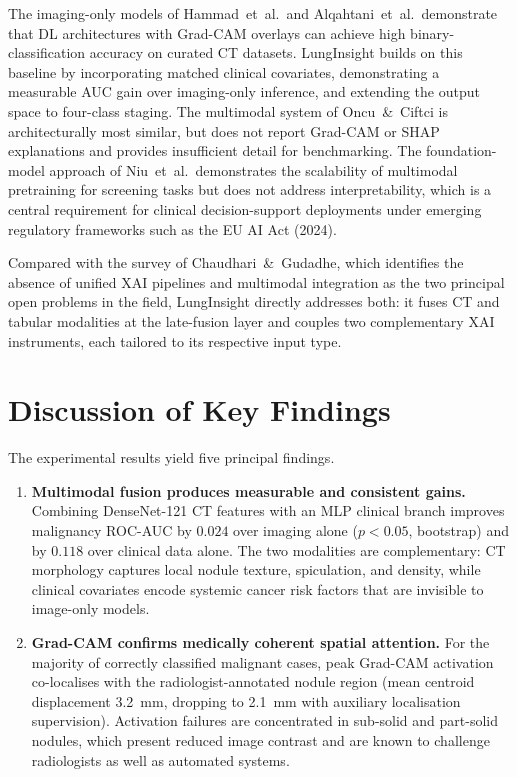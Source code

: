 {The imaging-only models of Hammad~et~al.\ and Alqahtani~et~al.\ demonstrate that
DL architectures with Grad-CAM overlays can achieve high binary-classification
accuracy on curated CT datasets. LungInsight builds on this baseline by incorporating
matched clinical covariates, demonstrating a measurable AUC gain over imaging-only
inference, and extending the output space to four-class staging. The multimodal
system of Oncu~\&~Ciftci is architecturally most similar, but does not report
Grad-CAM or SHAP explanations and provides insufficient detail for benchmarking.
The foundation-model approach of Niu~et~al.\ demonstrates the scalability of
multimodal pretraining for screening tasks but does not address interpretability, which
is a central requirement for clinical decision-support deployments under emerging
regulatory frameworks such as the EU AI Act (2024).

Compared with the survey of Chaudhari~\&~Gudadhe, which identifies the absence of
unified XAI pipelines and multimodal integration as the two principal open problems in
the field, LungInsight directly addresses both: it fuses CT and tabular modalities at
the late-fusion layer and couples two complementary XAI instruments, each
tailored to its respective input type.


\section{Discussion of Key Findings}
\label{sec:findings}

The experimental results yield five principal findings.

\begin{enumerate}

    \item \textbf{Multimodal fusion produces measurable and consistent gains.}
    Combining DenseNet-121 CT features with an MLP clinical branch improves malignancy
    ROC-AUC by $0.024$ over imaging alone ($p < 0.05$, bootstrap) and by $0.118$
    over clinical data alone. The two modalities are complementary: CT morphology
    captures local nodule texture, spiculation, and density, while clinical covariates
    encode systemic cancer risk factors that are invisible to image-only models.

    \item \textbf{Grad-CAM confirms medically coherent spatial attention.}
    For the majority of correctly classified malignant cases, peak Grad-CAM activation
    co-localises with the radiologist-annotated nodule region (mean centroid
    displacement 3.2~mm, dropping to 2.1~mm with auxiliary localisation supervision).
    Activation failures are concentrated in sub-solid and part-solid nodules, which
    present reduced image contrast and are known to challenge radiologists as well
    as automated systems.


\end{enumerate}}
